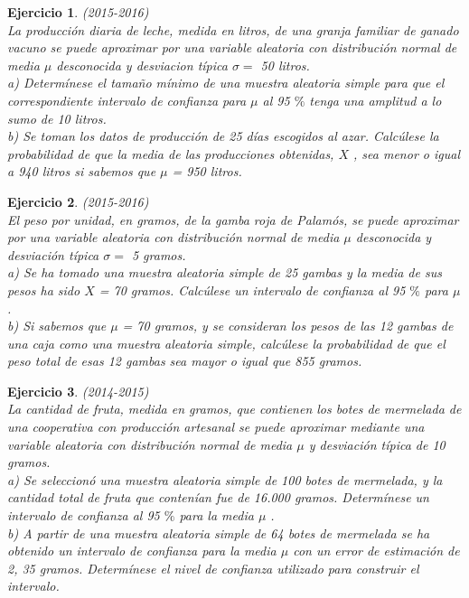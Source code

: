 \documentclass[12pt, a4paper]{amsart}
\newtheorem{ejer}{Ejercicio}
\begin{document}
\begin{ejer}\em (2015-2016)\\
La producción diaria de leche, medida en litros, de una granja familiar de ganado vacuno se puede aproximar
por una variable aleatoria con distribución normal de media $\mu$ desconocida y desviacion típica  $\sigma =$ 50 litros.\\
a) Determínese el tamaño mínimo de una muestra aleatoria simple para que el correspondiente intervalo de
confianza para $\mu$ al 95 $\%$ tenga una amplitud a lo sumo de 10 litros.\\
b) Se toman los datos de producción de 25 días escogidos al azar. Calcúlese la probabilidad de que la media
de las producciones obtenidas, $X$ , sea menor o igual a 940 litros si sabemos que $\mu$ = 950 litros.
\end{ejer}

\begin{ejer}\em (2015-2016)\\
El peso por unidad, en gramos, de la gamba roja de Palamós, se puede aproximar por una variable aleatoria
con distribución normal de media $\mu$ desconocida y desviación típica  $\sigma =$ 5 gramos.\\
a) Se ha tomado una muestra aleatoria simple de 25 gambas y la media de sus pesos ha sido $X$ = 70 gramos.
Calcúlese un intervalo de confianza al 95 $\%$ para $\mu$ .\\
b) Si sabemos que $\mu$ = 70 gramos, y se consideran los pesos de las 12 gambas de una caja como una muestra
aleatoria simple, calcúlese la probabilidad de que el peso total de esas 12 gambas sea mayor o igual que 855
gramos.
\end{ejer}

\begin{ejer}\em (2014-2015)\\
La cantidad de fruta, medida en gramos, que contienen los botes de mermelada de una cooperativa con
producción artesanal se puede aproximar mediante una variable aleatoria con distribución normal de media
 $\mu$ y desviación típica de 10 gramos.\\
a) Se seleccionó una muestra aleatoria simple de 100 botes de mermelada, y la cantidad total de fruta que
contenían fue de 16.000 gramos. Determínese un intervalo de confianza al 95 $\%$ para la media $\mu$ .\\
b) A partir de una muestra aleatoria simple de 64 botes de mermelada se ha obtenido un intervalo de confianza
para la media $\mu$ con un error de estimación de 2, 35 gramos. Determínese el nivel de confianza utilizado para
construir el intervalo.
\end{ejer}
\end{document}
